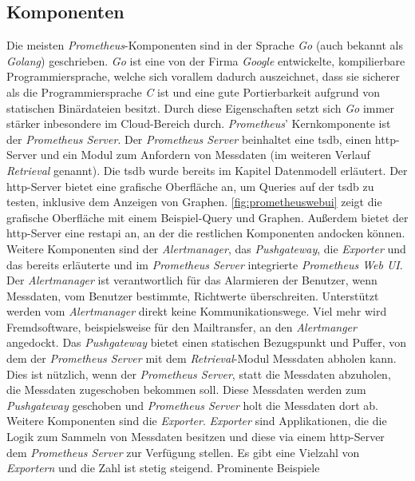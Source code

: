\documentclass[titlepage]{report}
\begin{document}
\subsection*{Komponenten}
Die meisten \emph{Prometheus}\hyp{}Komponenten sind in der Sprache
\emph{Go} (auch bekannt als \emph{Golang}) geschrieben. \emph{Go} ist
eine von der Firma \emph{Google} entwickelte, kompilierbare
Programmiersprache, welche sich vorallem dadurch auszeichnet, dass sie
sicherer als die Programmiersprache \emph{C} ist und eine gute
Portierbarkeit aufgrund von statischen Binärdateien besitzt. Durch diese
Eigenschaften setzt sich \emph{Go} immer stärker inbesondere im
Cloud\hyp{}Bereich durch\cite{INFOWORLD}. \emph{Prometheus}'
Kernkomponente ist der \emph{Prometheus Server}. Der \emph{Prometheus
Server} beinhaltet eine \gls{tsdb}, einen \gls{http}\hyp{}Server und ein
Modul zum Anfordern von Messdaten (im weiteren Verlauf
\emph{Retrieval} genannt). Die \gls{tsdb} wurde bereits im Kapitel
Datenmodell erläutert. Der \gls{http}\hyp{}Server bietet eine grafische
Oberfläche an, um Queries auf der \gls{tsdb} zu testen, inklusive
dem Anzeigen von Graphen. \autoref{fig:prometheuswebui} zeigt
die grafische Oberfläche mit einem Beispiel\hyp{}Query und Graphen.
Außerdem bietet der \gls{http}\hyp{}Server
eine \gls{restapi} an, an der die restlichen Komponenten andocken
können. Weitere Komponenten sind der \emph{Alertmanager}, das
\emph{Pushgateway}, die \emph{Exporter} und das bereits erläuterte und
im \emph{Prometheus Server} integrierte \emph{Prometheus Web UI}. Der
\emph{Alertmanager} ist verantwortlich für das Alarmieren der Benutzer,
wenn Messdaten, vom Benutzer bestimmte, Richtwerte überschreiten.
Unterstützt werden vom \emph{Alertmanager} direkt keine
Kommunikationswege. Viel mehr wird Fremdsoftware, beispielsweise für den
Mailtransfer, an den \emph{Alertmanger} angedockt. Das
\emph{Pushgateway} bietet einen statischen Bezugspunkt und Puffer, von dem der
\emph{Prometheus Server} mit dem \emph{Retrieval}\hyp{}Modul Messdaten
abholen kann. Dies ist nützlich, wenn der \emph{Prometheus Server}, statt
die Messdaten abzuholen, die Messdaten zugeschoben bekommen soll. Diese Messdaten
werden zum \emph{Pushgateway} geschoben und \emph{Prometheus
Server} holt die Messdaten dort ab. Weitere Komponenten sind die
\emph{Exporter}. \emph{Exporter} sind Applikationen, die die
Logik zum Sammeln von Messdaten besitzen und diese via einem
\gls{http}\hyp{}Server dem \emph{Prometheus Server} zur Verfügung
stellen. Es gibt eine Vielzahl von
\emph{Exportern} und die Zahl ist stetig steigend. Prominente Beispiele
\end{document}
